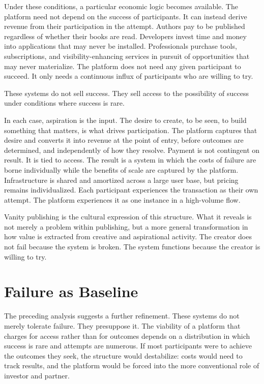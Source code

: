 \documentclass[12pt, a4paper]{article}
\begin{document}
Under these conditions, a particular economic logic becomes available. The platform need not depend on the success of participants. It can instead derive revenue from their participation in the attempt. Authors pay to be published regardless of whether their books are read. Developers invest time and money into applications that may never be installed. Professionals purchase tools, subscriptions, and visibility-enhancing services in pursuit of opportunities that may never materialize. The platform does not need any given participant to succeed. It only needs a continuous influx of participants who are willing to try.

These systems do not sell success. They sell access to the possibility of success under conditions where success is rare.

In each case, aspiration is the input. The desire to create, to be seen, to build something that matters, is what drives participation. The platform captures that desire and converts it into revenue at the point of entry, before outcomes are determined, and independently of how they resolve. Payment is not contingent on result. It is tied to access. The result is a system in which the costs of failure are borne individually while the benefits of scale are captured by the platform. Infrastructure is shared and amortized across a large user base, but pricing remains individualized. Each participant experiences the transaction as their own attempt. The platform experiences it as one instance in a high-volume flow.

Vanity publishing is the cultural expression of this structure. What it reveals is not merely a problem within publishing, but a more general transformation in how value is extracted from creative and aspirational activity. The creator does not fail because the system is broken. The system functions because the creator is willing to try.

\section{Failure as Baseline}

The preceding analysis suggests a further refinement. These systems do not merely tolerate failure. They presuppose it. The viability of a platform that charges for access rather than for outcomes depends on a distribution in which success is rare and attempts are numerous. If most participants were to achieve the outcomes they seek, the structure would destabilize: costs would need to track results, and the platform would be forced into the more conventional role of investor and partner.
\end{document}
